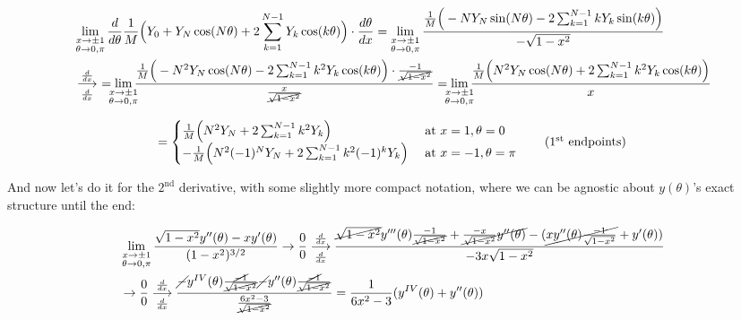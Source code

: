 \documentclass[10pt]{article}
\begin{document}
\begin{align*}
&\lim_{\substack{x \to \pm 1 \\ \theta \to 0,\pi}} \frac{d}{d\theta} \frac{1}{M} \Big( Y_0 + Y_N \cos(N\theta) + 2 \sum_{k=1}^{N-1} Y_k \cos(k\theta) \Big) \cdot \frac{d\theta}{dx} = \lim_{\substack{x \to \pm 1 \\ \theta \to 0,\pi}} \frac{\frac{1}{M} \Big(-N Y_N \sin(N\theta) - 2 \sum_{k=1}^{N-1} k Y_k \sin(k\theta) \Big)}{-\sqrt{1-x^2}} \\
&\underset{\frac{d}{dx}}{\overset{\frac{d}{dx}}{\longrightarrow}}\ = \lim_{\mathclap{\substack{x \to \pm 1 \\ \theta \to 0,\pi}}} \frac{\frac{1}{M} \Big(-N^2 Y_N \cos(N\theta) - 2 \sum_{k=1}^{N-1} k^2 Y_k \cos(k\theta) \Big) \cdot \frac{-1}{\cancel{\sqrt{1-x^2}}}}{\frac{x}{\cancel{\sqrt{1-x^2}}}} = \lim_{\mathclap{\substack{x \to \pm 1 \\ \theta \to 0,\pi}}} \frac{\frac{1}{M} \Big(N^2 Y_N \cos(N\theta) + 2 \sum_{k=1}^{N-1} k^2 Y_k \cos(k\theta) \Big)}{x}
\end{align*}

\[
= \begin{cases} \frac{1}{M} \Big(N^2 Y_N + 2 \sum_{k=1}^{N-1} k^2 Y_k \Big) & \text{ at } x=1, \theta=0 \\ -\frac{1}{M} \Big(N^2 (-1)^N Y_N + 2 \sum_{k=1}^{N-1} k^2 (-1)^k Y_k \Big) & \text{ at } x=-1, \theta=\pi \end{cases} \tag{$1^\text{st}$ endpoints}
\]

And now let's do it for the $2^\text{nd}$ derivative, with some slightly more compact notation, where we can be agnostic about $y(\theta)$'s exact structure until the end:

\begin{align*}
&\lim_{\substack{x \to \pm 1 \\ \theta \to 0,\pi}} \frac{\sqrt{1 - x^2} y''(\theta) - x y'(\theta)}{(1-x^2)^{3/2}} \rightarrow \frac{0}{0} \underset{\frac{d}{dx}}{\overset{\frac{d}{dx}}{\longrightarrow}} \frac{\cancel{\sqrt{1-x^2}}y'''(\theta)\frac{-1}{\cancel{\sqrt{1-x^2}}} + \cancel{\frac{-x}{\sqrt{1-x^2}}y''(\theta)} - (\cancel{xy''(\theta)\frac{-1}{\sqrt{1-x^2}}} + y'(\theta))}{-3x\sqrt{1-x^2}}\\
& \rightarrow \frac{0}{0} \underset{\frac{d}{dx}}{\overset{\frac{d}{dx}}{\longrightarrow}} \frac{\cancel{-}y^{IV}(\theta)\frac{\cancel{-1}}{\cancel{\sqrt{1-x^2}}} \cancel{-} y''(\theta)\frac{\cancel{-1}}{\cancel{\sqrt{1-x^2}}}}{\frac{6x^2 - 3}{\cancel{\sqrt{1-x^2}}}} = \frac{1}{6x^2 - 3}(y^{IV}(\theta) + y''(\theta))
\end{align*}
\end{document}
